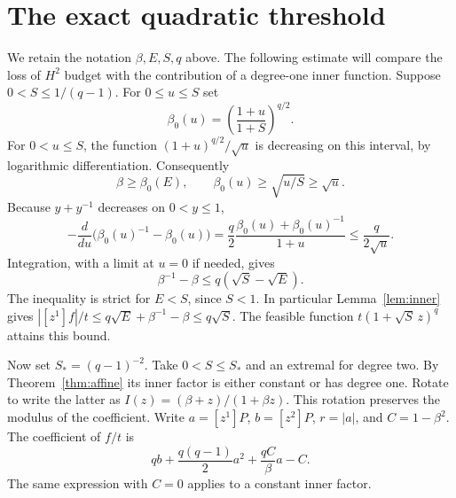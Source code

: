 \documentclass[11pt]{article}
\numberwithin{equation}{section}
\theoremstyle{remark}
\newcommand{\coef}[1]{[z^{#1}]}
\begin{document}
\section{The exact quadratic threshold}\label{sec:k2}

We retain the notation \(\beta,E,S,q\) above. The following estimate
will compare the loss of \(H^2\) budget with the contribution of a
degree-one inner function. Suppose \(0<S\le1/(q-1)\). For \(0\le u\le S\) set
\[
  \beta_0(u)=\left(\frac{1+u}{1+S}\right)^{q/2}.
\]
For \(0<u\le S\), the function \((1+u)^{q/2}/\sqrt u\)
is decreasing on this interval, by logarithmic differentiation.
Consequently
\begin{equation}\label{eq:beta-min}
  \beta\ge\beta_0(E),\qquad
  \beta_0(u)\ge\sqrt{u/S}\ge\sqrt u.
\end{equation}
Because \(y+y^{-1}\) decreases on \(0<y\le1\),
\[
  -\frac{d}{du}\bigl(\beta_0(u)^{-1}-\beta_0(u)\bigr)
   =\frac{q}{2}\frac{\beta_0(u)+\beta_0(u)^{-1}}{1+u}
   \le\frac{q}{2\sqrt u}.
\]
Integration, with a limit at \(u=0\) if needed, gives
\begin{equation}\label{eq:beta-cost}
   \beta^{-1}-\beta\le q(\sqrt S-\sqrt E).
\end{equation}
The inequality is strict for \(E<S\), since \(S<1\).
In particular Lemma~\ref{lem:inner} gives
\(|\coef{1}f|/t\le q\sqrt E+\beta^{-1}-\beta\le q\sqrt S\).
The feasible function \(t(1+\sqrt S\,z)^q\) attains this bound.

Now set \(S_*=(q-1)^{-2}\). Take \(0<S\le S_*\) and an extremal
for degree two. By Theorem~\ref{thm:affine} its inner factor is either
constant or has degree one. Rotate to write the latter as
\(I(z)=(\beta+z)/(1+\beta z)\).
This rotation preserves the modulus of the coefficient.
Write \(a=\coef{1}P\), \(b=\coef{2}P\), \(r=|a|\), and
\(C=1-\beta^2\). The coefficient of \(f/t\) is
\begin{equation}\label{eq:coeff2}
  qb+\frac{q(q-1)}2a^2+\frac{q C}{\beta}a-C .
\end{equation}
The same expression with \(C=0\) applies to a constant inner factor.
\end{document}

